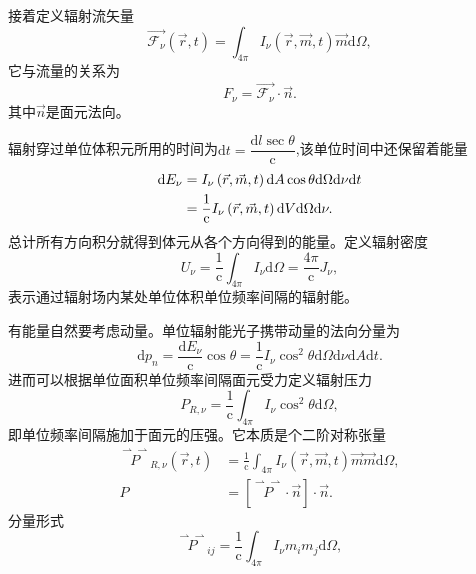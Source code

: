 \documentclass[../天体物理基础.tex]{subfiles}
\begin{document}
接着定义辐射流矢量
\begin{equation}
\vec{\mathcal{F}_{\nu}}(\vec{r},t)=\int_{4\pi}I_{\nu}\left(\vec{r},\vec{m},t\right)\vec{m}\mathrm{d}\Omega,
\end{equation}
它与流量的关系为
\begin{equation}
F_{\nu}=\vec{\mathcal{F}_{\nu}}\cdot\vec{n}.
\end{equation}
其中$\vec{n}$是面元法向。

辐射穿过单位体积元所用的时间为$\mathrm{d}t=\dfrac{\mathrm{d}l\sec\theta}{\mathrm{c}}$,该单位时间中还保留着能量
\begin{align}
\mathrm{d}E_{\nu}&=I_\nu\left(\vec{r},\vec{m},t\right)\mathrm{d}A\cos\theta\mathrm{d}\Omega\mathrm{d}\nu\mathrm{d}t\notag\\
&=\frac{1}{\mathrm{c}}I_\nu\left(\vec{r},\vec{m},t\right)\mathrm{d}V\mathrm{d}\Omega\mathrm{d}\nu.
\end{align}
总计所有方向积分就得到体元从各个方向得到的能量。定义辐射密度
\begin{equation}
U_{\nu}=\frac{1}{\mathrm{c}}\int_{4\pi}I_{\nu}\mathrm{d}\Omega=\frac{4\pi}{\mathrm{c}}J_{\nu},
\end{equation}
表示通过辐射场内某处单位体积单位频率间隔的辐射能。

有能量自然要考虑动量。单位辐射能光子携带动量的法向分量为
\begin{equation}
\mathrm{d}p_{n}=\frac{\mathrm{d}E_{\nu}}{\mathrm{c}}\cos\theta=\frac{1}{\mathrm{c}}I_{\nu}\cos^{2}\theta\mathrm{d}\Omega\mathrm{d}\nu\mathrm{d}A\mathrm{d}t.
\end{equation}
进而可以根据单位面积单位频率间隔面元受力定义辐射压力
\begin{equation}
P_{R,\nu}=\frac{1}{\mathrm{c}}\int_{4\pi}I_{\nu}\cos^{2}\theta\mathrm{d}\Omega,
\end{equation}
即单位频率间隔施加于面元的压强。它本质是个二阶对称张量
\begin{align}
\overset{\rightharpoonup\!\!\!\rightharpoonup}{P}_{R,\nu}\left(\vec{r},t\right)&=\frac{1}{\mathrm{c}}\int_{4\pi}I_\nu\left(\vec{r},\vec{m},t\right)\vec{m}\vec{m}\mathrm{d}\Omega,\\
P&=\left[\overset{\rightharpoonup\!\!\!\rightharpoonup}P\cdot\vec n\right]\cdot\vec n.
\end{align}
分量形式
\begin{equation}
\overset{\rightharpoonup\!\!\!\rightharpoonup}P_{ij}=\frac{1}{\mathrm{c}}\int_{4\pi}I_{\nu}m_{i}m_{j}\mathrm{d}\Omega,
\end{equation}
\end{document}
